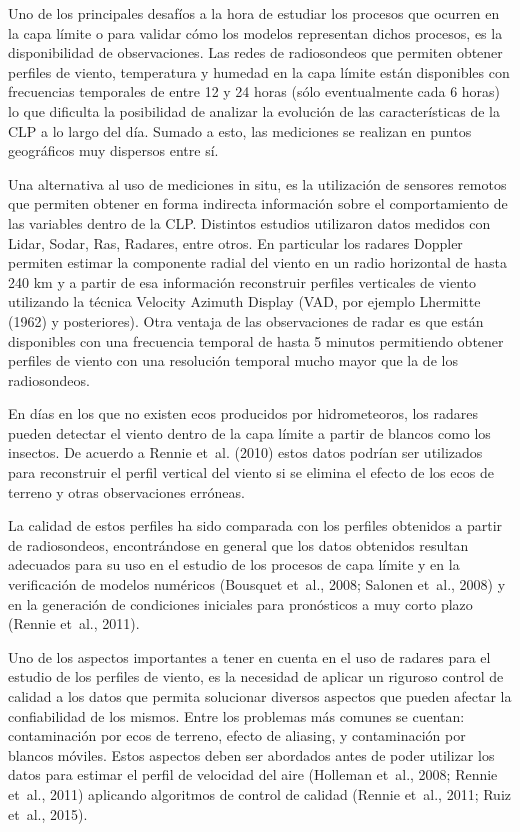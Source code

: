 \documentclass[12pt,spanish,oneside, a4paper]{book}
\begin{document}
Uno de los principales desafíos a la hora de estudiar los procesos que
ocurren en la capa límite o para validar cómo los modelos representan
dichos procesos, es la disponibilidad de observaciones. Las redes de
radiosondeos que permiten obtener perfiles de viento, temperatura y
humedad en la capa límite están disponibles con frecuencias temporales
de entre 12 y 24 horas (sólo eventualmente cada 6 horas) lo que
dificulta la posibilidad de analizar la evolución de las características
de la CLP a lo largo del día. Sumado a esto, las mediciones se realizan
en puntos geográficos muy dispersos entre sí.

Una alternativa al uso de mediciones in situ, es la utilización de
sensores remotos que permiten obtener en forma indirecta información
sobre el comportamiento de las variables dentro de la CLP. Distintos
estudios utilizaron datos medidos con Lidar, Sodar, Ras, Radares, entre
otros. En particular los radares Doppler permiten estimar la componente
radial del viento en un radio horizontal de hasta 240 km y a partir de
esa información reconstruir perfiles verticales de viento utilizando la
técnica Velocity Azimuth Display (VAD, por ejemplo Lhermitte (1962) y
posteriores). Otra ventaja de las observaciones de radar es que están
disponibles con una frecuencia temporal de hasta 5 minutos permitiendo
obtener perfiles de viento con una resolución temporal mucho mayor que
la de los radiosondeos.

En días en los que no existen ecos producidos por hidrometeoros, los
radares pueden detectar el viento dentro de la capa límite a partir de
blancos como los insectos. De acuerdo a Rennie et~al. (2010) estos datos
podrían ser utilizados para reconstruir el perfil vertical del viento si
se elimina el efecto de los ecos de terreno y otras observaciones
erróneas.

La calidad de estos perfiles ha sido comparada con los perfiles
obtenidos a partir de radiosondeos, encontrándose en general que los
datos obtenidos resultan adecuados para su uso en el estudio de los
procesos de capa límite y en la verificación de modelos numéricos
(Bousquet et~al., 2008; Salonen et~al., 2008) y en la generación de
condiciones iniciales para pronósticos a muy corto plazo (Rennie et~al.,
2011).

Uno de los aspectos importantes a tener en cuenta en el uso de radares
para el estudio de los perfiles de viento, es la necesidad de aplicar un
riguroso control de calidad a los datos que permita solucionar diversos
aspectos que pueden afectar la confiabilidad de los mismos. Entre los
problemas más comunes se cuentan: contaminación por ecos de terreno,
efecto de aliasing, y contaminación por blancos móviles. Estos aspectos
deben ser abordados antes de poder utilizar los datos para estimar el
perfil de velocidad del aire (Holleman et~al., 2008; Rennie et~al.,
2011) aplicando algoritmos de control de calidad (Rennie et~al., 2011;
Ruiz et~al., 2015).
\end{document}
